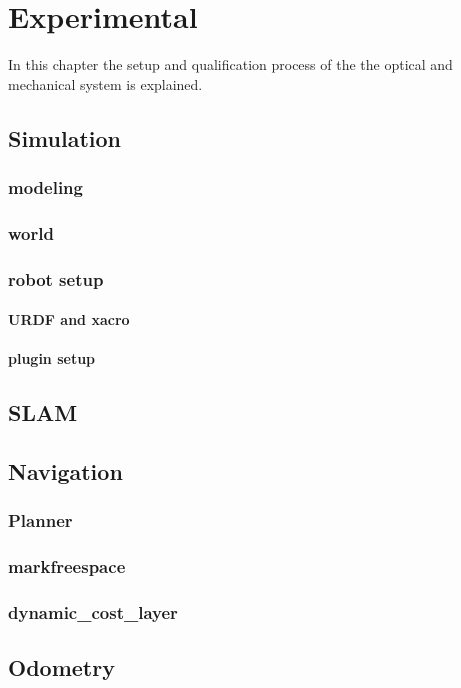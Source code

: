 \chapter{Experimental}
\label{experimental}

In this chapter the setup and qualification process of the the optical and mechanical system is explained.  



\section{Simulation}
\subsection{modeling}
\subsection{world}
\subsection{robot setup}
\subsubsection{URDF and xacro}
\subsubsection{plugin setup}
\section{SLAM}

\section{Navigation}
\subsection{Planner}
\subsection{markfreespace}
\subsection{dynamic\_cost\_layer}
\section{Odometry}
